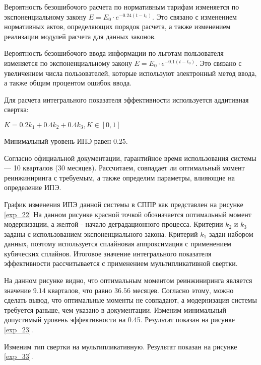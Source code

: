 Вероятность безошибочого расчета по нормативным тарифам изменяется по экспоненциальному закону $E=E_0 \cdot e^{-0.24(t-t_0)}$.
Это связано с изменением нормативных актов, определяющих порядок расчета, а также изменением реализации модулей расчета для данных законов.

Вероятность безошибочого ввода информации по льготам пользователя изменяется по экспоненциальному закону $E=E_0 \cdot e^{-0.1(t-t_0)}$.
Это связано с увеличением числа пользователей, которые используют электронный метод ввода, а также общим процентом ошибок ввода.

Для расчета интегрального показателя эффективности используется аддитивная свертка:
\begin{center}
$K=0.2k_1+0.4k_2+0.4k_3, K \in [0,1]$
\end{center}

Минимальный уровень ИПЭ равен 0.25.

Согласно официальной документации, гарантийное время использования системы --- 10 кварталов (30 месяцев).
Рассчитаем, совпадает ли оптимальный момент реинжиниринга с требуемым, а также определим параметры, влияющие на определение ИПЭ.

График изменения ИПЭ данной системы в СППР как представлен на рисунке \ref{exp_22}
На данном рисунке красной точкой обозначается оптимальный момент модернизации, а желтой - начало деградационного процесса.
Критерии $k_2$ и $k_3$ заданы с использованием экспоненциального закона.
Критерий $k_1$ задан набором данных, поэтому используется сплайновая аппроксимация с применением кубических сплайнов.
Итоговое значение интегрального показателя эффективности рассчитывается с применением мультипликативной свертки.


На данном рисунке видно, что оптимальным моментом реинжиниринга является значение $9.14$ кварталов, 
что равно $36.56$ месяцев. 
Согласно этому, можно сделать вывод, что оптимальные моменты не совпадают, а модернизация системы требуется раньше, чем указано в документации.
Изменим минимальный допустимый уровень эффективности на 0.45. Результат показан на рисунке \ref{exp_23}.


Изменим тип свертки на мультипликативную. 
Результат показан на рисунке \ref{exp_33}.


